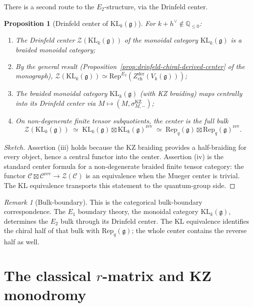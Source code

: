 \documentclass[11pt]{article}
\newtheorem{proposition}[theorem]{Proposition}
\theoremstyle{definition}
\theoremstyle{remark}
\newtheorem{remark}[theorem]{Remark}
\newcommand{\Rep}{\mathrm{Rep}}
\newcommand{\cC}{\mathcal{C}}
\newcommand{\cZ}{\mathcal{Z}}
\newcommand{\frakg}{\mathfrak{g}}
\newcommand{\KL}{\mathrm{KL}}
\newcommand{\KZ}{\mathrm{KZ}}
\newcommand{\hv}{h^\vee}
\begin{document}
There is a second route to the $E_2$-structure, via the Drinfeld center.

\begin{proposition}[Drinfeld center of $\KL_k(\frakg)$]
\label{prop:drinfeld-center-kl}
For $k + \hv \notin \mathbb{Q}_{\le 0}$:
\begin{enumerate}[label=(\roman*)]
 \item The Drinfeld center $\cZ(\KL_k(\frakg))$ of the monoidal
 category $\KL_k(\frakg)$ is a braided monoidal category;
 \item By the general result (Proposition~\ref{prop:drinfeld-chiral-derived-center}
 of the monograph),
 $\cZ(\KL_k(\frakg)) \simeq \Rep^{E_2}(Z^{\mathrm{der}}_{\mathrm{ch}}(V_k(\frakg)))$;
 \item The braided monoidal category $\KL_k(\frakg)$ (with KZ braiding)
 maps centrally into its Drinfeld center via
 $M \mapsto (M, \sigma_{M,-}^{\KZ})$;
 \item On non-degenerate finite tensor subquotients, the center is
 the full bulk
 \[
 \cZ(\KL_k(\frakg))
 \;\simeq\;
 \KL_k(\frakg)\boxtimes\KL_k(\frakg)^{\mathrm{rev}}
 \;\simeq\;
 \Rep_q(\frakg)\boxtimes\Rep_q(\frakg)^{\mathrm{rev}} .
 \]
\end{enumerate}
\end{proposition}

\begin{proof}[Sketch]
Assertion (iii) holds because the KZ braiding provides a half-braiding
for every object, hence a central functor into the center. Assertion
(iv) is the standard center formula for a non-degenerate braided finite
tensor category: the functor
$\cC\boxtimes\cC^{\mathrm{rev}}\to\cZ(\cC)$ is an equivalence when the
Mueger center is trivial. The KL equivalence transports this statement
to the quantum-group side.
\end{proof}

\begin{remark}[Bulk-boundary]
This is the categorical bulk-boundary correspondence. The $E_1$ boundary
theory, the monoidal category $\KL_k(\frakg)$, determines the $E_2$ bulk
through its Drinfeld center. The KL equivalence identifies the chiral
half of that bulk with $\Rep_q(\frakg)$; the whole center contains the
reverse half as well.
\end{remark}

\section{The classical $r$-matrix and KZ monodromy}
\label{sec:r-matrix-collision}
\end{document}
